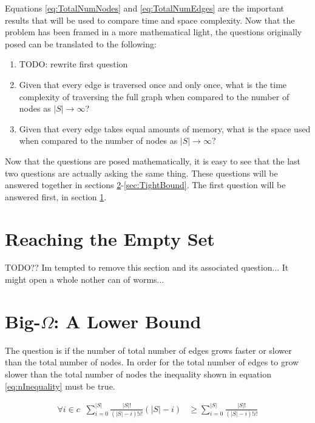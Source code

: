 \documentclass{article}
\begin{document}
Equations \ref{eq:TotalNumNodes} and \ref{eq:TotalNumEdges} are the important results that will be used to compare time and space complexity. Now that the problem has been framed in a more mathematical light, the questions originally posed can be translated to the following:

\begin{enumerate}
    \item TODO: rewrite first question
    \item Given that every edge is traversed once and only once, what is the time complexity of traversing the full graph when compared to the number of nodes as $|S|\to\infty$?
    \item Given that every edge takes equal amounts of memory, what is the space used when compared to the number of nodes as $|S|\to\infty$?
\end{enumerate}

Now that the questions are posed mathematically, it is easy to see that the last two questions are actually asking the same thing. These questions will be answered together in sections \ref{sec:LowerBound}-\ref{sec:TightBound}. The first question will be answered first, in section \ref{sec:ReachingTheEmptySet}.

\section{Reaching the Empty Set}
\label{sec:ReachingTheEmptySet}

TODO?? Im tempted to remove this section and its associated question... It might open a whole nother can of worms...


\section{Big-$\Omega$: A Lower Bound}
\label{sec:LowerBound}

The question is if the number of total number of edges grows faster or slower than the total number of nodes. In order for the total number of edges to grow slower than the total number of nodes the inequality shown in equation \ref{eq:nInequality} must be true.

\begin{equation}
    \begin{split}
        \forall i\in c\;\; \sum_{i=0}^{|S|}\frac{|S|!}{(|S|-i)!i!}(|S|-i) & \ge \sum_{i=0}^{|S|}\frac{|S|!}{(|S|-i)!i!}
    \end{split}
    \label{eq:nInequality}
\end{equation}
\end{document}
